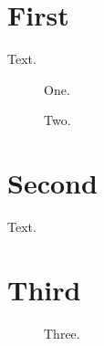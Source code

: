 \documentclass{report}
\begin{document}
\listoffigures
\listoftables
\chapter{First}
Text.
\begin{figure}[h]\centering\caption{One.}\end{figure}
\begin{figure}[h]\centering\caption{Two.}\end{figure}
\chapter{Second}
Text.
\begin{table}[h]\centering\caption{A table.}\end{table}
\chapter{Third}
\begin{figure}[h]\centering\caption{Three.}\end{figure}
\end{document}

